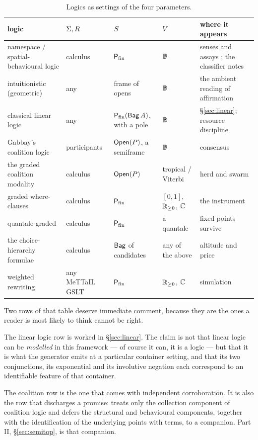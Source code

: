 \begin{table}[h]
\centering
\small
\renewcommand{\arraystretch}{1.3}
\begin{tabular}{@{}>{\raggedright\arraybackslash}p{3.1cm}>{\raggedright\arraybackslash}p{2.6cm}>{\raggedright\arraybackslash}p{2.9cm}>{\raggedright\arraybackslash}p{1.6cm}>{\raggedright\arraybackslash}p{3.4cm}@{}}
\toprule
logic & $\Sigma,R$ & $S$ & $V$ & where it appears \\
\midrule
namespace / spatial-behavioural logic
  & \rhoc{} calculus
  & $\mathsf{P}_{\mathrm{fin}}$
  & $\mathbb{B}$
  & senses and assays \cite{ScientistNote}; the classifier notes \\
intuitionistic (geometric)
  & any
  & frame of opens
  & $\mathbb{B}$
  & the ambient reading of affirmation \cite{Vickers89} \\
classical linear logic
  & any
  & $\mathsf{P}_{\mathrm{fin}}(\mathsf{Bag}\,A)$, with a pole
  & $\mathbb{B}$
  & \S\ref{sec:linear}; resource discipline \cite{Girard87} \\
Gabbay's coalition logic
  & participants
  & $\mathsf{Open}(P)$, a semiframe
  & $\mathbb{B}$
  & consensus \cite{Gabbay25,ConsensusTypes} \\
the graded coalition modality
  & \rhoc{} calculus
  & $\mathsf{Open}(P)$
  & tropical / Viterbi
  & herd and swarm \cite{QuorumNote} \\
graded where-clauses
  & \rhoc{} calculus
  & $\mathsf{P}_{\mathrm{fin}}$
  & $[0,1]$, $\mathbb{R}_{\ge0}$, $\mathbb{C}$
  & the instrument \cite{GradedWhere} \\
quantale-graded \rhoc{}
  & \rhoc{} calculus
  & $\mathsf{P}_{\mathrm{fin}}$
  & a quantale
  & fixed points survive \cite{FuzzyRho} \\
the choice-hierarchy formulae
  & \rhoc{} calculus
  & $\mathsf{Bag}$ of candidates
  & any of the above
  & altitude and price \cite{ChoiceFormulae} \\
weighted rewriting
  & any MeTTaIL GSLT
  & $\mathsf{P}_{\mathrm{fin}}$
  & $\mathbb{R}_{\ge0}$, $\mathbb{C}$
  & simulation \cite{WeightedGSLT} \\
\bottomrule
\end{tabular}
\caption{Logics as settings of the four parameters.}
\label{tab:instances}
\end{table}

Two rows of that table deserve immediate comment, because they are the ones a
reader is most likely to think cannot be right.

The linear logic row is worked in \S\ref{sec:linear}. The claim is not that linear
logic can be \emph{modelled} in this framework --- of course it can, it is a logic
--- but that it is what the generator emits at a particular container setting, and
that its two conjunctions, its exponential and its involutive negation each
correspond to an identifiable feature of that container.

The coalition row is the one that comes with independent corroboration. It is
also the row that discharges a promise: \cite{Zeus} treats only the collection
component of coalition logic and defers the structural and behavioural components,
together with the identification of the underlying points with \rhoc{} terms, to a
companion. Part II, \S\ref{sec:semitop}, is that companion.
